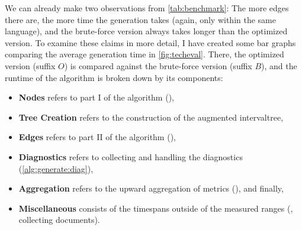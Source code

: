 \documentclass[../thesis]{subfiles}
\begin{document}
We can already make two observations from \cref{tab:benchmark}:
The more edges there are, the more time the generation takes (again, only within the same language), and the brute-force version always takes longer than the optimized version.
To examine these claims in more detail, I have created some bar graphs comparing the average generation time in \cref{fig:techeval}.
There, the optimized version (suffix $O$) is compared against the brute-force version (suffix $B$), and the runtime of the algorithm is broken down by its components:
\begin{itemize}
	\item \textbf{Nodes} refers to part I of the algorithm (),
	\item \textbf{Tree Creation} refers to the construction of the augmented \gls{intervaltree},
	\item \textbf{Edges} refers to part II of the algorithm (),
	\item \textbf{Diagnostics} refers to collecting and handling the diagnostics (\cref{alg:generate:diag}),
	\item \textbf{Aggregation} refers to the upward aggregation of metrics (), and finally,
	\item \textbf{Miscellaneous} consists of the timespans outside of the measured ranges (\eg, collecting documents).
\end{itemize}

\end{document}
